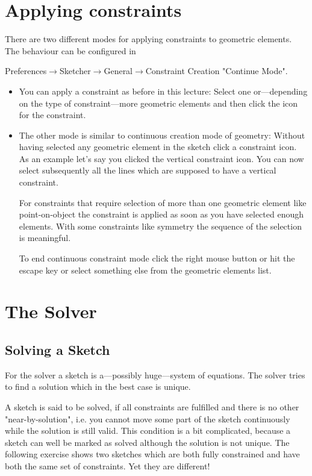\documentclass[12pt,titlepage]{article}
\newcommand{\menu}{\mbox{$\rightarrow$}}
\begin{document}
\section{Applying constraints} \label{ApplyingConstraints} There are two different modes for applying constraints to geometric elements. The behaviour can be configured in

Preferences\menu Sketcher\menu General\menu Constraint Creation "Continue Mode".\label{continueConstraints}



\begin{itemize} 
\item You can apply a constraint as before in this lecture: Select one or---depending on the type of constraint---more geometric elements and then click the icon for the constraint. 
\item The other mode is similar to continuous creation mode of geometry: Without having selected any geometric element in the sketch click a constraint icon. As an example let's say you clicked the vertical constraint icon. You can now select subsequently all the lines which are supposed to have a vertical constraint.
	
	For constraints that require selection of more than one geometric element like point-on-object the constraint is applied as soon as you have selected enough elements. With some constraints like symmetry the sequence of the selection is meaningful.
	
	To end continuous constraint mode click the right mouse button or hit the escape key or select something else from the geometric elements list. 
\end{itemize} 

\section{The Solver} \subsection{Solving a Sketch} For the solver a sketch is a---possibly huge---system of equations. The solver tries to find a solution which in the best case is unique.

A sketch is said to be solved, if all constraints are fulfilled and there is no other "near-by-solution", i.e. you cannot move some part of the sketch continuously while the solution is still valid. This condition is a bit complicated, because a sketch can well be marked as solved although the solution is not unique. The following exercise shows two sketches which are both fully constrained and have both the same set of constraints. Yet they are different!
\end{document}
